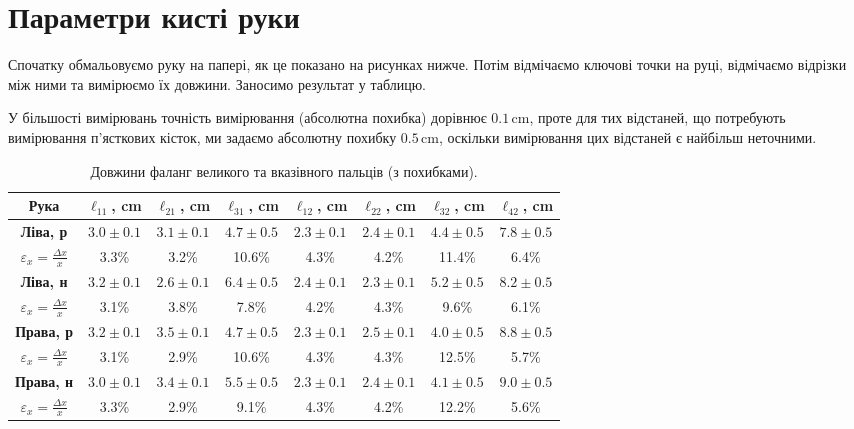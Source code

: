 \documentclass{hw_template}
\begin{document}
\newpage

\section{Параметри кисті руки}

Спочатку обмальовуємо руку на папері, як це показано на рисунках нижче. Потім відмічаємо
ключові точки на руці, відмічаємо відрізки між ними та вимірюємо їх довжини. Заносимо 
результат у таблицю.

У більшості вимірювань точність вимірювання (абсолютна похибка) дорівнює
$0.1\,\text{cm}$, проте для тих відстаней, що потребують вимірювання п'ясткових 
кісток, ми задаємо абсолютну похибку $0.5\,\text{cm}$, оскільки вимірювання цих
відстаней є найбільш неточними.

\begin{table}[H]
    \centering
    \begin{tabular}{c:ccccccc}
        \hline
        \textbf{Рука} & \textbf{$\ell_{11}$, cm} & \textbf{$\ell_{21}$, cm} & \textbf{$\ell_{31}$, cm} & \textbf{$\ell_{12}$, cm} & \textbf{$\ell_{22}$, cm} & \textbf{$\ell_{32}$, cm} & \textbf{$\ell_{42}$, cm} \\
        \hline
        \textbf{Ліва, р} & $3.0 \pm 0.1$ & $3.1 \pm 0.1$ & $4.7\pm 0.5$ & $2.3 \pm 0.1$ & $2.4 \pm 0.1$ & $4.4 \pm 0.5$ & $7.8 \pm 0.5$ \\
        $\varepsilon_x = \frac{\Delta x}{x}$ & 3.3\% & 3.2\% & 10.6\% & 4.3\% & 4.2\% & 11.4\% & 6.4\% \\
        \hdashline
        \textbf{Ліва, н} & $3.2 \pm 0.1$ & $2.6 \pm 0.1$ & $6.4 \pm 0.5$ & $2.4 \pm 0.1$ & $2.3 \pm 0.1$ & $5.2 \pm 0.5$ & $8.2 \pm 0.5$ \\
        $\varepsilon_x = \frac{\Delta x}{x}$ & 3.1\% & 3.8\% & 7.8\% & 4.2\% & 4.3\% & 9.6\% & 6.1\% \\
        \hdashline
        \textbf{Права, р} & $3.2 \pm 0.1$ & $3.5 \pm 0.1$ & $4.7 \pm 0.5$ & $2.3 \pm 0.1$ & $2.5 \pm 0.1$ & $4.0 \pm 0.5$ & $8.8 \pm 0.5$ \\
        $\varepsilon_x = \frac{\Delta x}{x}$ & 3.1\% & 2.9\% & 10.6\% & 4.3\% & 4.3\% & 12.5\% & 5.7\% \\
        \hdashline
        \textbf{Права, н} & $3.0 \pm 0.1$ & $3.4 \pm 0.1$ & $5.5 \pm 0.5$ & $2.3 \pm 0.1$ & $2.4 \pm 0.1$ & $4.1 \pm 0.5$ & $9.0 \pm 0.5$ \\
        $\varepsilon_x = \frac{\Delta x}{x}$ & 3.3\% & 2.9\% & 9.1\% & 4.3\% & 4.2\% & 12.2\% & 5.6\% \\
        \hline
    \end{tabular}
    \caption{Довжини фаланг великого та вказівного пальців (з похибками).}
\end{table}
\end{document}
